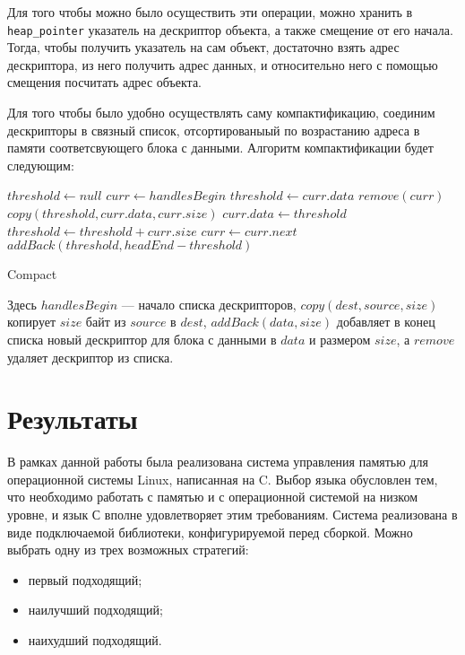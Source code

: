 Для того чтобы можно было осуществить эти операции, можно хранить в \lstinline{heap_pointer}
указатель на дескриптор объекта, а также смещение от его начала. Тогда, чтобы получить
указатель на сам объект, достаточно взять адрес дескриптора, из него 
получить адрес данных, и относительно него с помощью смещения посчитать адрес объекта. 

Для того чтобы было удобно осуществлять саму компактификацию, соединим дескрипторы в связный список, отсортированыый по возрастанию адреса в памяти
соответсвующего блока с данными. Алгоритм компактификации будет следующим:

\begin{algorithm}[H]
\begin{algorithmic}[1]
\State $threshold\gets null$
\State $curr\gets handlesBegin$
			\State $threshold\gets curr.data$		
		\EndIf
		\State $remove(curr)$		
			\State $copy(threshold, curr.data, curr.size)$
			\State $curr.data\gets threshold$
			\State $threshold\gets threshold + curr.size$
		\EndIf
	\State $curr\gets curr.next$
\EndWhile
\State $addBack(threshold, headEnd - threshold)$
\end{algorithmic}
\caption{Compact}
\end{algorithm}

Здесь $handlesBegin$ --- начало списка дескрипторов, $copy(dest, source, size)$ копирует
$size$ байт из $source$ в $dest$, $addBack(data, size)$ добавляет в конец списка
новый дескриптор для блока с данными в $data$ и размером $size$, а $remove$ удаляет
дескриптор из списка.


\section{Результаты}

В рамках данной работы была реализована система управления памятью для операционной 
системы Linux, написанная на C. Выбор языка обусловлен тем, что необходимо работать с памятью и 
с операционной системой на низком уровне, и язык С вполне удовлетворяет этим требованиям.
Система реализована в виде подключаемой библиотеки,
конфигурируемой перед сборкой. Можно выбрать одну из трех возможных стратегий:

\begin{itemize}
\item первый подходящий;
\item наилучший подходящий;
\item наихудший подходящий.
\end{itemize}

